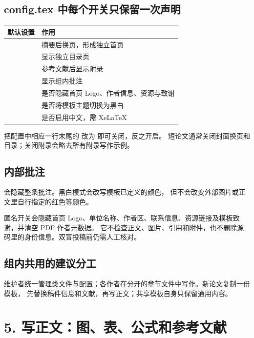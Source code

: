 \documentclass[11pt,a4paper,fontset=fandol]{ctexart}
\newcommand{\code}[1]{\texttt{\small\detokenize{#1}}}
\begin{document}
\subsection*{config.tex 中每个开关只保留一次声明}
\begin{tabularx}{\linewidth}{@{}lX@{}}
\toprule
默认设置 & 作用 \\\midrule
\code{\LabCoverPagetrue} & 摘要后换页，形成独立首页 \\
\code{\LabShowTOCtrue} & 显示独立目录页 \\
\code{\LabShowAppendixtrue} & 参考文献后显示附录 \\
\code{\LabShowNotestrue} & 显示组内批注 \\
\code{\LabAnonymousfalse} & 是否隐藏首页 Logo、作者信息、资源与致谢 \\
\code{\LabMonochromefalse} & 是否将模板主题切换为黑白 \\
\code{\LabChinesefalse} & 是否启用中文，需 XeLaTeX \\
\bottomrule
\end{tabularx}
把配置中相应一行末尾的 \code{true} 改为 \code{false} 即可关闭，反之开启。
短论文通常关闭封面换页和目录；关闭附录会略去所有附录写作示例。

\subsection*{内部批注}
\begin{Code}
\end{Code}
\code{\LabShowNotesfalse} 会隐藏整条批注。黑白模式会改写模板已定义的颜色，
但不会改变外部图片或正文里自行指定的红色等颜色。

\begin{Tip}
匿名开关会隐藏首页 Logo、单位名称、作者区、联系信息、资源链接及模板致谢，并清空 PDF 作者元数据。
它不检查正文、图片、引用和附件，也不删除源码里的身份信息。双盲投稿前仍需人工核对。
\end{Tip}

\subsection*{组内共用的建议分工}
维护者统一管理类文件与配置；各作者在分开的章节文件中写作。新论文复制一份模板，
先替换稿件信息和文献，再写正文；共享模板自身只保留通用内容。

\clearpage
\section*{5. 写正文：图、表、公式和参考文献}
\end{document}
